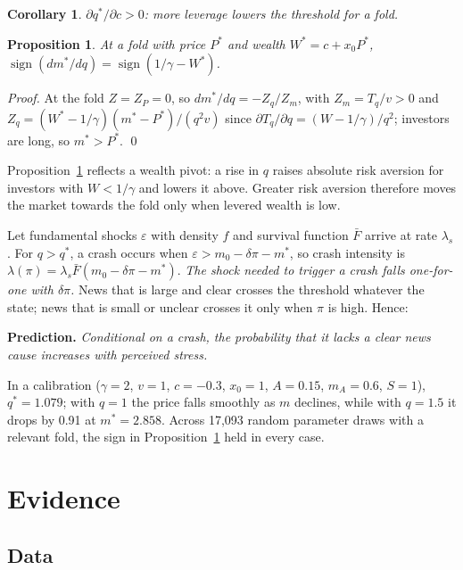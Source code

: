 \documentclass[11pt,a4paper]{article}
\newtheorem{proposition}{Proposition}
\newtheorem{corollary}{Corollary}
\begin{document}
\begin{corollary}\label{cor:lev}
$\partial q^*/\partial c>0$: more leverage lowers the threshold for a fold.
\end{corollary}

\begin{proposition}\label{prop:sign}
At a fold with price $P^*$ and wealth $W^*=c+x_0P^*$, $\operatorname{sign}(dm^*/dq)=
\operatorname{sign}(1/\gamma-W^*)$.
\end{proposition}

\noindent \emph{Proof.} At the fold $Z=Z_P=0$, so $dm^*/dq=-Z_q/Z_m$, with $Z_m=T_q/v>0$
and $Z_q=(W^*-1/\gamma)(m^*-P^*)/(q^2v)$ since $\partial T_q/\partial q=(W-1/\gamma)/q^2$;
investors are long, so $m^*>P^*$. \qed

\medskip
Proposition~\ref{prop:sign} reflects a wealth pivot: a rise in $q$ raises absolute risk
aversion for investors with $W<1/\gamma$ and lowers it above. Greater risk aversion
therefore moves the market towards the fold only when levered wealth is low.

Let fundamental shocks $\varepsilon$ with density $f$ and survival function $\bar F$ arrive
at rate $\lambda_s$. For $q>q^*$, a crash occurs when $\varepsilon>m_0-\delta\pi-m^*$, so
crash intensity is $\lambda(\pi)=\lambda_s\bar F(m_0-\delta\pi-m^*)$. \emph{The shock needed to
trigger a crash falls one-for-one with $\delta\pi$.} News that is large and clear crosses
the threshold whatever the state; news that is small or unclear crosses it only when $\pi$
is high. Hence:

\medskip
\noindent\textbf{Prediction.} \emph{Conditional on a crash, the probability that it lacks a
clear news cause increases with perceived stress.}

\medskip
\noindent In a calibration ($\gamma=2$, $v=1$, $c=-0.3$, $x_0=1$, $A=0.15$, $m_A=0.6$,
$S=1$), $q^*=1.079$; with $q=1$ the price falls smoothly as $m$ declines, while with $q=1.5$
it drops by 0.91 at $m^*=2.858$. Across 17{,}093 random parameter draws with a relevant fold,
the sign in Proposition~\ref{prop:sign} held in every case.

\section{Evidence}

\subsection{Data}
\end{document}
